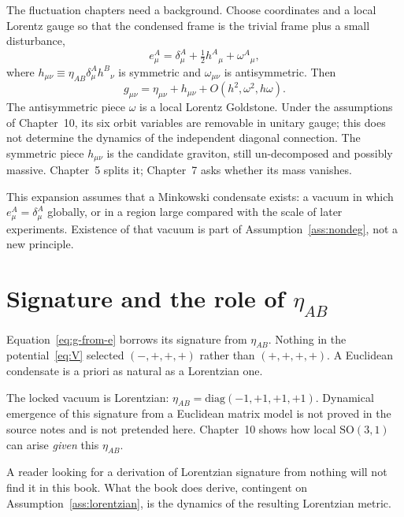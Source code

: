 The fluctuation chapters need a background. Choose coordinates and a
local Lorentz gauge so that the condensed frame is the trivial frame
plus a small disturbance,
\begin{equation}
  \label{eq:linear-frame}
  e^A_\mu=\delta^A_\mu+\tfrac12 h^A{}_\mu+\omega^A{}_\mu,
\end{equation}
where \(h_{\mu\nu}\equiv\eta_{AB}\delta^A_\mu h^B{}_\nu\) is symmetric
and \(\omega_{\mu\nu}\) is antisymmetric. Then
\begin{equation}
  \label{eq:linear-metric}
  g_{\mu\nu}
  =\eta_{\mu\nu}+h_{\mu\nu}+O(h^2,\omega^2,h\omega).
\end{equation}
The antisymmetric piece \(\omega\) is a local Lorentz Goldstone. Under
the assumptions of Chapter~10, its six orbit variables are removable
in unitary gauge; this does not determine the dynamics of the
independent diagonal connection. The symmetric piece \(h_{\mu\nu}\) is
the candidate graviton, still un-decomposed and possibly massive.
Chapter~5 splits it; Chapter~7 asks whether its mass vanishes.

This expansion assumes that a Minkowski condensate exists: a vacuum
in which \(e^A_\mu=\delta^A_\mu\) globally, or in a region large
compared with the scale of later experiments. Existence of that
vacuum is part of Assumption~\ref{ass:nondeg}, not a new principle.

\section{Signature and the role of \(\eta_{AB}\)}
\label{sec:ch4-signature}

Equation~\eqref{eq:g-from-e} borrows its signature from \(\eta_{AB}\).
Nothing in the potential~\eqref{eq:V} selected
\((-,+,+,+)\) rather than \((+,+,+,+)\). A Euclidean condensate is a
priori as natural as a Lorentzian one.

\begin{assumption}
  \label{ass:lorentzian}
  The locked vacuum is Lorentzian:
  \(\eta_{AB}=\mathrm{diag}(-1,+1,+1,+1)\). Dynamical emergence of
  this signature from a Euclidean matrix model is not proved in the
  source notes and is not pretended here. Chapter~10 shows how local
  \(\mathrm{SO}(3,1)\) can arise \emph{given} this \(\eta_{AB}\).
\end{assumption}

A reader looking for a derivation of Lorentzian signature from
nothing will not find it in this book. What the book does derive,
contingent on Assumption~\ref{ass:lorentzian}, is the dynamics of
the resulting Lorentzian metric.

